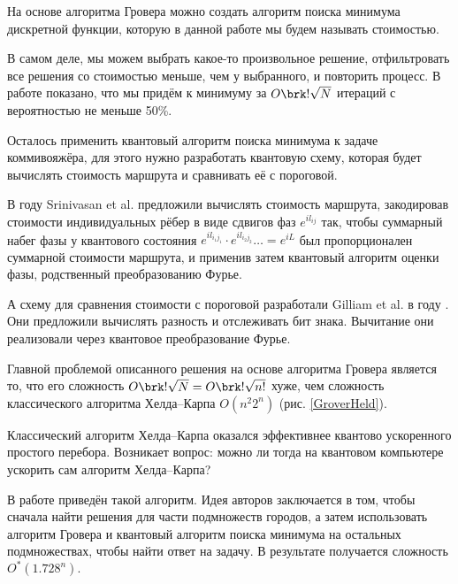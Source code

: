 На основе алгоритма Гровера можно создать алгоритм поиска минимума дискретной функции, которую в данной работе мы будем называть стоимостью. 

В самом деле, мы можем выбрать какое-то произвольное решение, отфильтровать все решения со стоимостью меньше, чем у выбранного, и повторить процесс. В работе \citeauthor{GroverMinima} \cite{GroverMinima} показано, что мы придём к минимуму за $O\brk!{\sqrt N}$ итераций с вероятностью не меньше 50\%.

Осталось применить квантовый алгоритм поиска минимума к задаче коммивояжёра, для этого нужно разработать квантовую схему, которая будет вычислять стоимость маршрута и сравнивать её с пороговой. 

В \citeyear{IBM} году Srinivasan et al. \cite{IBM} предложили вычислять стоимость маршрута, закодировав стоимости индивидуальных рёбер в виде сдвигов фаз $e^{i l_{ij}}$ так, чтобы суммарный набег фазы у квантового состояния $e^{i l_{i_1 j_1}} \cdot e^{i l_{i_2 j_2}} \dots = e^{iL}$ был пропорционален суммарной стоимости маршрута, и применив затем квантовый алгоритм оценки фазы, родственный преобразованию Фурье.

А схему для сравнения стоимости с пороговой разработали Gilliam et al. в \citeyear{GAS} году \cite{GAS}. Они предложили вычислять разность и отслеживать бит знака. Вычитание они реализовали через квантовое преобразование Фурье.

Главной проблемой описанного решения на основе алгоритма Гровера является то, что его сложность
$O\brk!{\sqrt{N}} = O\brk!{\sqrt{n!}}$ хуже, чем сложность классического алгоритма Хелда--Карпа $O(n^2 2^n)$ (рис. \ref{GroverHeld}).




Классический алгоритм Хелда--Карпа оказался эффективнее квантово ускоренного простого перебора. 
Возникает вопрос: можно ли тогда на квантовом компьютере ускорить сам алгоритм Хелда--Карпа?

В работе \cite{quantHeldKarp} приведён такой алгоритм. Идея авторов заключается в том, чтобы сначала найти решения для части подмножеств городов, а затем использовать алгоритм Гровера и квантовый алгоритм поиска минимума на остальных подмножествах, чтобы найти ответ на задачу. В результате получается сложность $O^*(1.728^n).$

